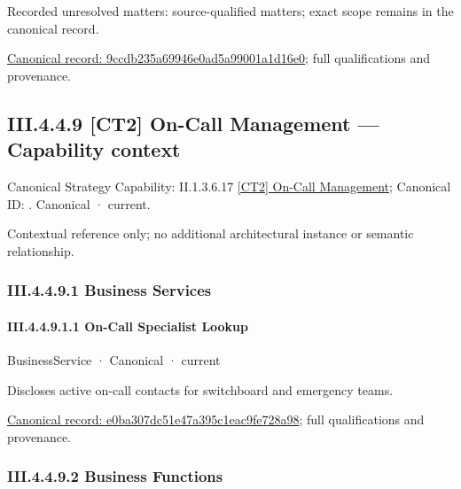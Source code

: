 {\small Recorded unresolved matters: source-qualified matters; exact scope remains in the canonical record.}\par
{\footnotesize \href{../../../../continuum/business/business-function/9ccdb235a69946e0ad5a99001a1d16e0.md}{Canonical record: 9ccdb235a69946e0ad5a99001a1d16e0}; full qualifications and provenance.}\par
\subsection*{III.4.4.9 [CT2] On-Call Management — Capability context}
\label{navigation:III.4.4.9}

{\small Canonical Strategy Capability: II.1.3.6.17 \hyperref[element:b16cef8f2bfd4b92948ec75cbcfa7b9a]{[CT2] On-Call Management}; Canonical ID: \texttt{}. Canonical · current.}\par
Contextual reference only; no additional architectural instance or semantic relationship.\par
\subsubsection*{III.4.4.9.1 Business Services}
\label{navigation:III.4.4.9.1}

\paragraph*{III.4.4.9.1.1 On-Call Specialist Lookup}
\label{navigation:III.4.4.9.1.1}

\label{element:e0ba307dc51e47a395c1eac9fe728a98}
{\small BusinessService · Canonical · current}\par

Discloses active on-call contacts for switchboard and emergency teams.


{\footnotesize \href{../../../../continuum/business/business-service/e0ba307dc51e47a395c1eac9fe728a98.md}{Canonical record: e0ba307dc51e47a395c1eac9fe728a98}; full qualifications and provenance.}\par
\subsubsection*{III.4.4.9.2 Business Functions}
\label{navigation:III.4.4.9.2}

